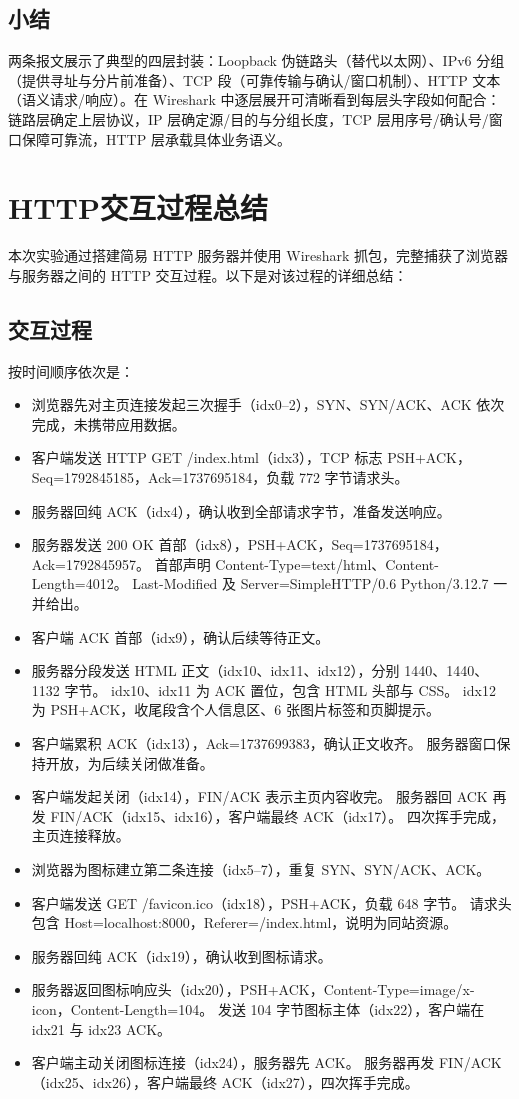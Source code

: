 \documentclass[a4paper]{article}
\begin{document}
	\subsection{小结}
	两条报文展示了典型的四层封装：Loopback 伪链路头（替代以太网）、IPv6 分组（提供寻址与分片前准备）、TCP 段（可靠传输与确认/窗口机制）、HTTP 文本（语义请求/响应）。在 Wireshark 中逐层展开可清晰看到每层头字段如何配合：链路层确定上层协议，IP 层确定源/目的与分组长度，TCP 层用序号/确认号/窗口保障可靠流，HTTP 层承载具体业务语义。
	
	\section{HTTP交互过程总结}
	本次实验通过搭建简易 HTTP 服务器并使用 Wireshark 抓包，完整捕获了浏览器与服务器之间的 HTTP 交互过程。以下是对该过程的详细总结：
	\subsection{交互过程}
	按时间顺序依次是：
	\begin{itemize}
		\item 浏览器先对主页连接发起三次握手（idx0–2），SYN、SYN/ACK、ACK 依次完成，未携带应用数据。
		\item 客户端发送 HTTP GET /index.html（idx3），TCP 标志 PSH+ACK，Seq=1792845185，Ack=1737695184，负载 772 字节请求头。
		\item 服务器回纯 ACK（idx4），确认收到全部请求字节，准备发送响应。
		\item 服务器发送 200 OK 首部（idx8），PSH+ACK，Seq=1737695184，Ack=1792845957。
		首部声明 Content-Type=text/html、Content-Length=4012。
		Last-Modified 及 Server=SimpleHTTP/0.6 Python/3.12.7 一并给出。
		\item 客户端 ACK 首部（idx9），确认后续等待正文。
		\item 服务器分段发送 HTML 正文（idx10、idx11、idx12），分别 1440、1440、1132 字节。
		idx10、idx11 为 ACK 置位，包含 HTML 头部与 CSS。
		idx12 为 PSH+ACK，收尾段含个人信息区、6 张图片标签和页脚提示。
		\item 客户端累积 ACK（idx13），Ack=1737699383，确认正文收齐。
		服务器窗口保持开放，为后续关闭做准备。
		\item 客户端发起关闭（idx14），FIN/ACK 表示主页内容收完。
		服务器回 ACK 再发 FIN/ACK（idx15、idx16），客户端最终 ACK（idx17）。
		四次挥手完成，主页连接释放。
		\item 浏览器为图标建立第二条连接（idx5–7），重复 SYN、SYN/ACK、ACK。
		\item 客户端发送 GET /favicon.ico（idx18），PSH+ACK，负载 648 字节。
		请求头包含 Host=localhost:8000，Referer=/index.html，说明为同站资源。
		\item 服务器回纯 ACK（idx19），确认收到图标请求。
		\item 服务器返回图标响应头（idx20），PSH+ACK，Content-Type=image/x-icon，Content-Length=104。
		发送 104 字节图标主体（idx22），客户端在 idx21 与 idx23 ACK。
		\item 客户端主动关闭图标连接（idx24），服务器先 ACK。
		服务器再发 FIN/ACK（idx25、idx26），客户端最终 ACK（idx27），四次挥手完成。
	\end{itemize}
\end{document}
